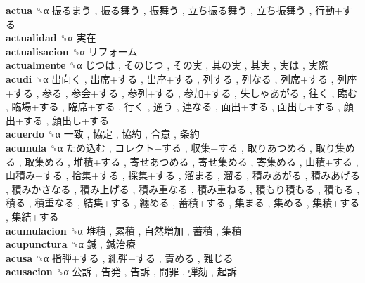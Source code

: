 \textbf{actua} ␝α   振るまう ,  振る舞う ,  振舞う ,  立ち振る舞う ,  立ち振舞う ,  行動+する   \\
\textbf{actualidad} ␝α   実在   \\
\textbf{actualisacion} ␝α   リフォーム   \\
\textbf{actualmente} ␝α   じつは ,  そのじつ ,  その実 ,  其の実 ,  其実 ,  実は ,  実際   \\
\textbf{acudi} ␝α   出向く ,  出席+する ,  出座+する ,  列する ,  列なる ,  列席+する ,  列座+する ,  参る ,  参会+する ,  参列+する ,  参加+する ,  失しゃあがる ,  往く ,  臨む ,  臨場+する ,  臨席+する ,  行く ,  通う ,  連なる ,  面出+する ,  面出し+する ,  顔出+する ,  顔出し+する   \\
\textbf{acuerdo} ␝α   一致 ,  協定 ,  協約 ,  合意 ,  条約   \\
\textbf{acumula} ␝α   ため込む ,  コレクト+する ,  収集+する ,  取りあつめる ,  取り集める ,  取集める ,  堆積+する ,  寄せあつめる ,  寄せ集める ,  寄集める ,  山積+する ,  山積み+する ,  拾集+する ,  採集+する ,  溜まる ,  溜る ,  積みあがる ,  積みあげる ,  積みかさなる ,  積み上げる ,  積み重なる ,  積み重ねる ,  積もり積もる ,  積もる ,  積る ,  積重なる ,  結集+する ,  纏める ,  蓄積+する ,  集まる ,  集める ,  集積+する ,  集結+する   \\
\textbf{acumulacion} ␝α   堆積 ,  累積 ,  自然増加 ,  蓄積 ,  集積   \\
\textbf{acupunctura} ␝α   鍼 ,  鍼治療   \\
\textbf{acusa} ␝α   指弾+する ,  糺弾+する ,  責める ,  難じる   \\
\textbf{acusacion} ␝α   公訴 ,  告発 ,  告訴 ,  問罪 ,  弾劾 ,  起訴   \\
